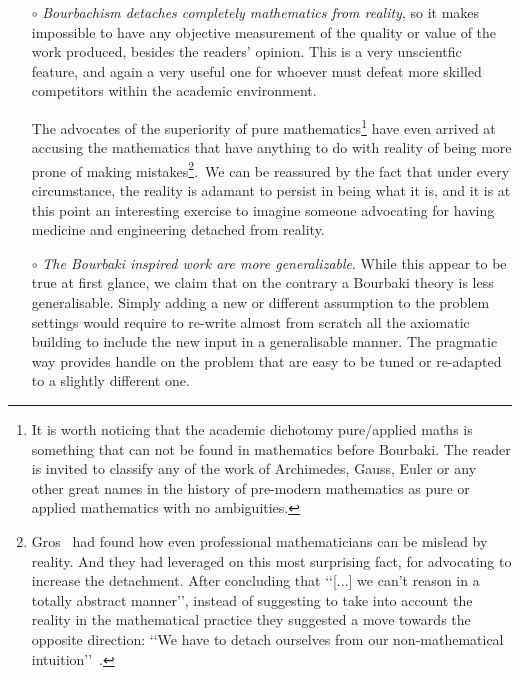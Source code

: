 \documentclass[]{scrartcl}
\theoremstyle{definition}
\begin{document}
\begin{itemize}
    \item[$\circ$] \emph{Bourbachism detaches completely mathematics from reality}, so it makes impossible to have any objective measurement of the quality or value of the work produced, besides the readers' opinion. This is a very unscientfic feature, and again a very useful one for whoever must defeat  more skilled competitors within the academic environment.

    The advocates of the superiority of pure mathematics\footnote{
        It is worth noticing that the academic dichotomy pure/applied maths is something that can not be found in mathematics before Bourbaki. The reader is invited to classify any of the work of Archimedes, Gauss, Euler or any other great names in the history of pre-modern mathematics as pure or applied mathematics with no ambiguities.
    } have even arrived at accusing the mathematics that have anything to do with reality of being more prone of making mistakes\footnote{
        Gros~\cite{gros2019masters} had found how even professional mathematicians can be mislead by reality. And they had leveraged on this most surprising fact, for advocating to increase the detachment. After concluding that \lq\lq [...] we can't reason in a totally abstract manner\rq\rq, instead of suggesting to take into account the reality in the mathematical practice they suggested a move towards the opposite direction: \lq\lq We have to detach ourselves from our non-mathematical intuition\rq\rq~\cite{gros2019sciencedaily}.
    }. We can be reassured by the fact that under every circumstance, the reality is adamant to persist in being what it is, and it is at this point an interesting exercise to imagine someone advocating for having medicine and engineering detached from reality.

    \item[$\circ$] \emph{The Bourbaki inspired work are more generalizable}. While this appear to be true at first glance, we claim that on the contrary a Bourbaki theory is less generalisable. Simply adding a new or different assumption to the problem settings would require to re-write almost from scratch all the axiomatic building to include the new input in a generalisable manner. The pragmatic way provides handle on the problem that are easy to be tuned or re-adapted to a slightly different one.


\end{itemize}
\end{document}

